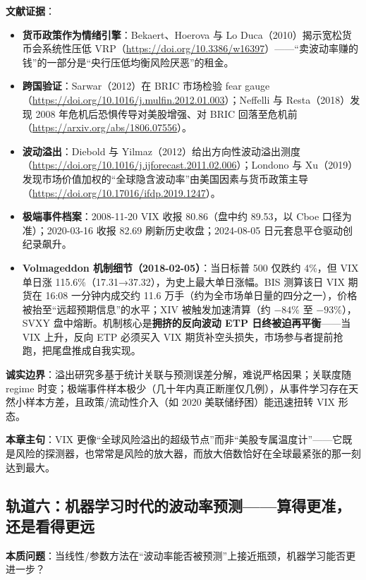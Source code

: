 \documentclass[11pt,a4paper]{article}
\begin{document}
\textbf{文献证据}：
\begin{itemize}[leftmargin=2.2em]
  \item \textbf{货币政策作为情绪引擎}：Bekaert、Hoerova 与 Lo Duca（2010）揭示宽松货币会系统性压低 VRP（\url{https://doi.org/10.3386/w16397}）——“卖波动率赚的钱”的一部分是“央行压低均衡风险厌恶”的租金。
  \item \textbf{跨国验证}：Sarwar（2012）在 BRIC 市场检验 fear gauge（\url{https://doi.org/10.1016/j.mulfin.2012.01.003}）；Neffelli 与 Resta（2018）发现 2008 年危机后恐惧传导对美股增强、对 BRIC 回落至危机前（\url{https://arxiv.org/abs/1806.07556}）。
  \item \textbf{波动溢出}：Diebold 与 Yilmaz（2012）给出方向性波动溢出测度（\url{https://doi.org/10.1016/j.ijforecast.2011.02.006}）；Londono 与 Xu（2019）发现市场价值加权的“全球隐含波动率”由美国因素与货币政策主导（\url{https://doi.org/10.17016/ifdp.2019.1247}）。
  \item \textbf{极端事件档案}：2008-11-20 VIX 收报 80.86（盘中约 89.53，以 Cboe 口径为准）；2020-03-16 收报 82.69 刷新历史收盘；2024-08-05 日元套息平仓驱动创纪录飙升。
  \item \textbf{Volmageddon 机制细节（2018-02-05）}：当日标普 500 仅跌约 4\%，但 VIX 单日涨 115.6\%（17.31→37.32），为史上最大单日涨幅。BIS 测算该日 VIX 期货在 16:08 一分钟内成交约 11.6 万手（约为全市场单日量的四分之一），价格被抬至“远超预期信息”的水平；XIV 被触发加速清算（约 $-84\%$ 至 $-93\%$），SVXY 盘中熔断。机制核心是\textbf{拥挤的反向波动 ETP 日终被迫再平衡}——当 VIX 上升，反向 ETP 必须买入 VIX 期货补空头损失，市场参与者提前抢跑，把尾盘推成自我实现。
\end{itemize}

\textbf{诚实边界}：溢出研究多基于统计关联与预测误差分解，难说严格因果；关联度随 regime 时变；极端事件样本极少（几十年内真正断崖仅几例），从事件学习存在天然小样本方差，且政策/流动性介入（如 2020 美联储纾困）能迅速扭转 VIX 形态。

\textbf{本章主句}：VIX 更像“全球风险溢出的超级节点”而非“美股专属温度计”——它既是风险的探测器，也常常是风险的放大器，而放大倍数恰好在全球最紧张的那一刻达到最大。

\subsection{轨道六：机器学习时代的波动率预测——算得更准，还是看得更远}

\textbf{本质问题}：当线性/参数方法在“波动率能否被预测”上接近瓶颈，机器学习能否更进一步？
\end{document}
